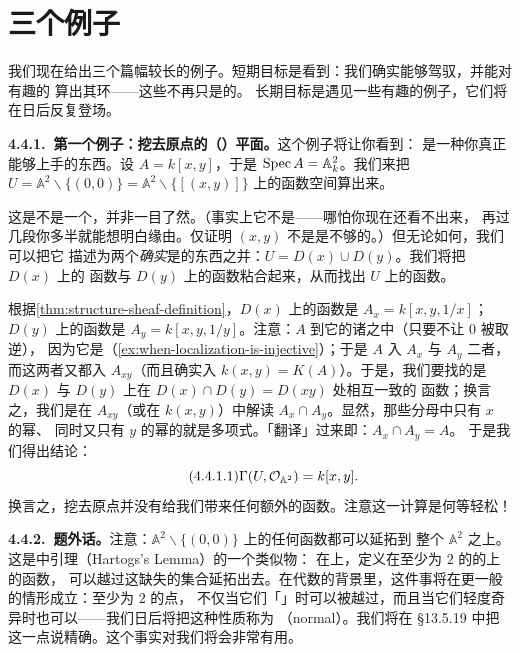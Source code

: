 
\section{三个例子}

我们现在给出三个篇幅较长的例子。短期目标是看到：我们确实能够驾驭\trStructureSheaf，并能对有趣的%
\trOpenSet{}算出其\trSection{}环——这些\trOpenSet{}不再只是\trAffineScheme{}的\trDistinguishedOpen。%
长期目标是遇见一些有趣的例子，它们将在日后反复登场。

\textbf{4.4.1.\ 第一个例子：挖去原点的（\trAffine）平面。}\quad 这个例子将让你看到：\trDistinguishedBase{}%
是一种你真正能够上手的东西。设 $A=k[x,y]$，于是 $\operatorname{Spec} A=\mathbb{A}^2_k$。我们来把\trOpenSet{}%
$U=\mathbb{A}^2\smallsetminus\{(0,0)\}=\mathbb{A}^2\smallsetminus\{[(x,y)]\}$ 上的函数空间算出来。

这是不是一个\trDistinguishedOpen，并非一目了然。（事实上它不是——哪怕你现在还看不出来，%
再过几段你多半就能想明白缘由。仅证明 $(x,y)$ 不是\trPrincipalIdeal{}是不够的。）但无论如何，我们可以把它%
描述为两个\emph{确实}是\trDistinguishedOpen{}的东西之并：$U=D(x)\cup D(y)$。我们将把 $D(x)$ 上的%
函数与 $D(y)$ 上的函数粘合起来，从而找出 $U$ 上的函数。

根据\cref{thm:structure-sheaf-definition}，$D(x)$ 上的函数是 $A_x=k[x,y,1/x]$；$D(y)$ 上的函数是%
$A_y=k[x,y,1/y]$。注意：$A$ \trInjectiveMap{}到它的诸\trLocalization{}之中（只要不让 $0$ 被取逆），%
因为它是\trIntegralDomain（\cref{ex:when-localization-is-injective}）；于是 $A$ \trInjectiveMap{}入%
$A_x$ 与 $A_y$ 二者，而这两者又都\trInjectiveMap{}入 $A_{xy}$（而且确实\trInjectiveMap{}入%
$k(x,y)=K(A)$）。于是，我们要找的是 $D(x)$ 与 $D(y)$ 上在 $D(x)\cap D(y)=D(xy)$ 处相互一致的%
函数；换言之，我们是在 $A_{xy}$（或在 $k(x,y)$）中解读 $A_x\cap A_y$。显然，那些分母中只有 $x$ 的幂、%
同时又只有 $y$ 的幂的\trRationalFunction{}就是多项式。「翻译」过来即：$A_x\cap A_y=A$。%
于是我们得出结论：
\begin{equation*}\tag{4.4.1.1}\label{eq:global-sections-plane-minus-origin}
\Gamma(U,\mathcal{O}_{\mathbb{A}^2})=k[x,y].
\end{equation*}
换言之，挖去原点并没有给我们带来任何额外的函数。注意这一计算是何等轻松！

\textbf{4.4.2.\ 题外话。}\quad 注意：$\mathbb{A}^2\smallsetminus\{(0,0)\}$ 上的任何函数都可以延拓到%
整个 $\mathbb{A}^2$ 之上。这是\trComplexGeometry{}中\trHartogs{}引理（Hartogs's Lemma）的一个类似物：%
在\trComplex\trManifold{}上，定义在\trCodimension{}至少为 $2$ 的\trSet{}的\trComplement{}上的\trHolomorphic{}函数，%
可以越过这缺失的集合延拓出去。在代数的背景里，这件事将在更一般的情形成立：\trCodimension{}至少为 $2$ 的点，%
不仅当它们「\trSmooth」时可以被越过，而且当它们轻度奇异时也可以——我们日后将把这种性质称为%
\emph{\trNormal}（normal）。我们将在 \S13.5.19 中把这一点说精确。这个事实对我们将会非常有用。

